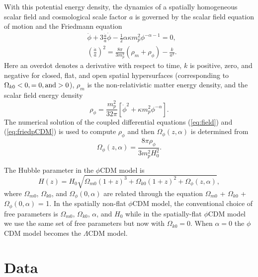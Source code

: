 \documentclass[a4paper,fleqn,usenatbib]{mnras}
\begin{document}
With this potential energy density, the dynamics of a spatially homogeneous scalar field and cosmological scale factor $a$ is governed by the scalar field equation of motion and the Friedmann equation
\begin{align}
\label{eq:field}
   & \ddot{\phi}  + 3\frac{\dot{a}}{a}\dot\phi - \frac{1}{2}\alpha \kappa m_{p}^2 \phi^{-\alpha - 1} = 0, \\
\label{eq:friedpCDM}
   & \left(\frac{\dot{a}}{a}\right)^2 = \frac{8 \pi}{3 m_{p}^2}\left(\rho_m + \rho_{\phi}\right) - \frac{k}{a^2}.
\end{align}
Here an overdot denotes a derivative with respect to time, $k$ is positive, zero, and negative for closed, flat, and open spatial hypersurfaces (corresponding to $\Omega_{k0} < 0, =0, {\rm and} >0$), $\rho_m$ is the non-relativistic matter energy density, and the scalar field energy density
\begin{equation}
    \rho_{\phi} = \frac{m^2_p}{32\pi}\left[\dot{\phi}^2 + \kappa m^2_p \phi^{-\alpha}\right].
\end{equation}
The numerical solution of the coupled differential equations (\ref{eq:field}) and (\ref{eq:friedpCDM}) is used to compute $\rho_{\phi}$ and then $\Omega_{\phi}(z, \alpha)$ is determined from 
\begin{equation}
    \Omega_{\phi}(z, \alpha) = \frac{8\pi \rho_{\phi}}{3 m^2_p H^2_0}.
\end{equation}

The Hubble parameter in the $\phi$CDM model is
\begin{equation}
    H(z) = H_0\sqrt{\Omega_{m0}(1+z)^3 + \Omega_{k0}(1+z)^2 + \Omega_{\phi}\left(z, \alpha\right)},
\end{equation}
where $\Omega_{m0}$, $\Omega_{k0}$, and $\Omega_{\phi}(0, \alpha)$ are related through the equation $\Omega_{m0}$ + $\Omega_{k0}$ + $\Omega_{\phi}(0, \alpha)$ = 1. In the spatially non-flat $\phi$CDM model, the conventional choice of free parameters is $\Omega_{m0}$, $\Omega_{k0}$, $\alpha$, and $H_0$ while in the spatially-flat $\phi$CDM model we use the same set of free parameters but now with $\Omega_{k0} = 0$. When $\alpha = 0$ the $\phi$CDM model becomes the $\Lambda$CDM model.

\section{Data}
\label{sec:data}
\end{document}
